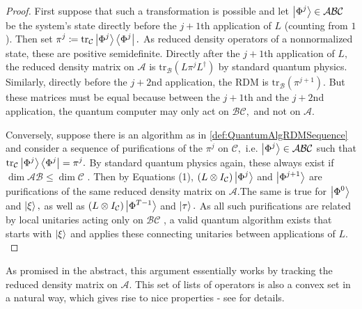 \documentclass{article}
\begin{document}
\begin{proof}
First suppose that such a transformation is possible and let $\displaystyle \ket{\Phi ^{j}}\in\mathcal{ABC}$ be the system's state directly before the $\displaystyle j+1$th application of $\displaystyle L$ (counting from $\displaystyle 1$). Then set $\displaystyle \pi ^{j} \coloneq \mathrm{tr}_{\mathcal{C}}\ket{\Phi ^{j}}\bra{\Phi ^{j}} .$ As reduced density operators of a nonnormalized state, these are positive semidefinite. Directly after the $\displaystyle j+1$th application of $\displaystyle L,$ the reduced density matrix on $\displaystyle \mathcal{A}$ is $\displaystyle \mathrm{tr}_{\mathcal{B}}\left( L \pi ^{j} L^{\dagger }\right)$ by standard quantum physics. Similarly, directly before the $\displaystyle j+2$nd application, the RDM is $\displaystyle \mathrm{tr}_{\mathcal{B}}\left( \pi ^{j+1}\right) .$ But these matrices must be equal because between the $\displaystyle j+1$th and the $\displaystyle j+2$nd application, the quantum computer may only act on $\displaystyle \mathcal{BC} ,$ and not on $\displaystyle \mathcal{A} .$

Conversely, suppose there is an algorithm as in \ref{def:QuantumAlgRDMSequence} and consider a sequence of purifications of the $\displaystyle \pi ^{j}$ on $\displaystyle \mathcal{C} ,$ i.e. $\displaystyle \ket{\Phi ^{j}} \in \mathcal{ABC}$ such that $\displaystyle \mathrm{tr}_{\mathcal{C}}\ket{\Phi ^{j}}\bra{\Phi ^{j}} =\pi ^{j} .$ By standard quantum physics again, these always exist if $\displaystyle \dim\mathcal{AB} \leq \dim\mathcal{C}$ \cite{nielsen2002quantum}. Then by Equations (1), $\displaystyle ( L\otimes I_{\mathcal{C}})\ket{\Phi ^{j}}$ and $\displaystyle \ket{\Phi ^{j+1}}$ are purifications of the same reduced density matrix on $\displaystyle \mathcal{A} .$The same is true for $\displaystyle \ket{\Phi ^{0}}$ and $\displaystyle \ket{\xi } ,$ as well as $\displaystyle ( L\otimes I_{\mathcal{C}})\ket{\Phi ^{T-1}}$ and $\displaystyle \ket{\tau } .$ As all such purifications are related by local unitaries acting only on $\displaystyle \mathcal{BC}$ \cite{OzolsUnitaryEquivalence}, a valid quantum algorithm exists that starts with $\displaystyle \ket{\xi }$ and applies these connecting unitaries between applications of $\displaystyle L.$
\end{proof}

As promised in the abstract, this argument essentially works by tracking the reduced density matrix on $\displaystyle \mathcal{A} .$ This set of lists of operators is also a convex set in a natural way, which gives rise to nice properties - see \cite{LasVegas} for details.
\end{document}
